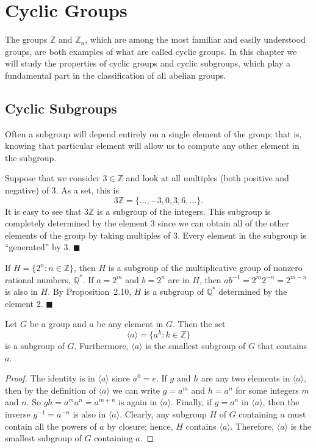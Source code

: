 \chapter{Cyclic Groups}\label{cyclic}
 
The groups $\mathbb Z$ and ${\mathbb Z}_n$, which are among the most familiar and easily understood groups, are both examples of what are called cyclic groups.  In this chapter we will study the properties of cyclic groups and cyclic subgroups, which play a fundamental part in the classification of all abelian groups. 


\section{Cyclic Subgroups}

Often a subgroup will depend entirely on a single element of the group; that is, knowing that particular element will allow us to compute any other element in the subgroup. 

\medskip

Suppose that we consider $3 \in {\mathbb Z}$ and look at all multiples (both positive and negative) of 3.  As a set, this is 
$$
3 {\mathbb Z} = \{ \ldots, -3, 0, 3, 6, \ldots \}.
$$
It is easy to see that $3 {\mathbb Z}$ is a subgroup of the integers.  This subgroup is completely determined by the element 3 since we can obtain all of the other elements of the group by taking multiples of 3.  Every element in the subgroup is ``generated'' by 3. 
\hspace{\fill} $\blacksquare$

\medskip

If $H = \{ 2^n : n \in {\mathbb Z} \}$, then $H$ is a subgroup of the multiplicative group of nonzero rational numbers, ${\mathbb Q}^*$.  If $a = 2^m$ and $b = 2^n$ are in $H$, then $ab^{-1} = 2^m 2^{-n} = 2^{m-n}$ is also in $H$.  By Proposition~2.10, $H$ is a subgroup of ${\mathbb Q}^*$ determined by the element 2. 
\hspace{\fill} $\blacksquare$

\begin{theorem}
Let $G$ be a group and $a$ be any element in $G$.  Then the set
$$
\langle a \rangle  = \{ a^k : k \in {\mathbb Z} \}\label{generatedby}
$$
is a subgroup of $G$.  Furthermore, $\langle a \rangle$ is the smallest subgroup of $G$ that contains~$a$. 
\end{theorem}
 
 
\begin{proof}
The identity is in $\langle a \rangle $ since $a^0 = e$. If $g$ and
$h$ are any two elements in $\langle a \rangle $, then by the
definition of $\langle a \rangle$ we can write $g = a^m$ and $h = a^n$
for some integers $m$ and $n$. So $gh = a^m a^n = a^{m+n}$ is again in
$\langle a \rangle $. Finally, if $g = a^n$ in $\langle a \rangle $,
then the inverse $g^{-1} = a^{-n}$ is also in $\langle a \rangle $.
Clearly, any subgroup $H$ of $G$ containing $a$ must contain all the
powers of $a$ by closure; hence, $H$ contains $\langle a \rangle $.
Therefore, $\langle a \rangle $ is the smallest subgroup of $G$
containing $a$. 
\end{proof}
 
